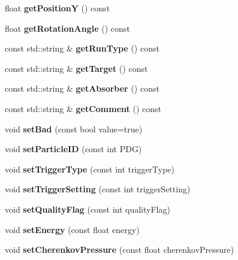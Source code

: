 \begin{DoxyCompactItemize}
\item 
float {\bfseries get\-Position\-Y} () const \label{classElogInfo_aeb9c2820182962e6cbf4948d7b499497}

\item 
float {\bfseries get\-Rotation\-Angle} () const \label{classElogInfo_a4c9048e7d39bf69f07eae7f36b2ebe18}

\item 
const std\-::string \& {\bfseries get\-Run\-Type} () const \label{classElogInfo_a37a5fe5048240fbf933d36bbcd04e06a}

\item 
const std\-::string \& {\bfseries get\-Target} () const \label{classElogInfo_a7f7fc291269b0be343d582f285de3017}

\item 
const std\-::string \& {\bfseries get\-Absorber} () const \label{classElogInfo_a3d220dc6f046cef5c011eff24d29fbf7}

\item 
const std\-::string \& {\bfseries get\-Comment} () const \label{classElogInfo_ae727cd3fc39302b75735019738f6f0de}

\item 
void {\bfseries set\-Bad} (const bool value=true)\label{classElogInfo_a36f8b7ea5380fb62126ba9044f491121}

\item 
void {\bfseries set\-Particle\-I\-D} (const int P\-D\-G)\label{classElogInfo_aa8e947cf87146fac3ca9cd84e448fc24}

\item 
void {\bfseries set\-Trigger\-Type} (const int trigger\-Type)\label{classElogInfo_ae2f30828e8745bcc295cf98db9a402cd}

\item 
void {\bfseries set\-Trigger\-Setting} (const int trigger\-Setting)\label{classElogInfo_adfa385546a2174849f6520550d8d4c88}

\item 
void {\bfseries set\-Quality\-Flag} (const int quality\-Flag)\label{classElogInfo_ac03fcea03d11f6f59decddb2f957ba6e}

\item 
void {\bfseries set\-Energy} (const float energy)\label{classElogInfo_a8695ff52afbeb10594b4304f92730ae7}

\item 
void {\bfseries set\-Cherenkov\-Pressure} (const float cherenkov\-Pressure)\label{classElogInfo_a134b756001d0af0dcc80310d3b5a603e}


\end{DoxyCompactItemize}
